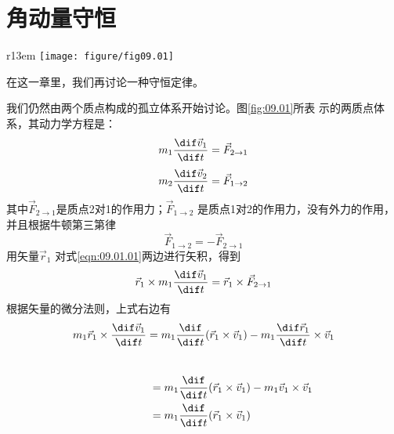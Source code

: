 \documentclass[../outline-of-mechanics.tex]{subfiles}
\begin{document}
\section{角动量守恒}

\begin{wrapfigure}[6]{r}{13em}
  \vspace{-4em}
  \centering
  \texttt{[image: figure/fig09.01]}
  \caption{两质点体系}
  \label{fig:09.01}
\end{wrapfigure}
在这一章里，我们再讨论一种守恒定律。

我们仍然由两个质点构成的孤立体系开始讨论。图\ref{fig:09.01}所表
示的两质点体系，其动力学方程是：
\begin{equation}\label{eqn:09.01.01}
  m _ { 1 } \frac { \dif \vec{v} _ { 1 } } { \dif t } = \vec{F} _ { 2 \to 1 }
\end{equation}
\begin{equation}\label{eqn:09.01.02}
  m _ { 2 } \frac { \dif \vec{v} _ { 2 } } { \dif t } = \vec{F} _ { 1 \to 2 }
\end{equation}
其中$\vec{F} _ { 2 \to 1 }$是质点2对1的作用力；$\vec{F} _ { 1 \to 2 }$
是质点1对2的作用力，没有外力的作用，并且根据牛顿第三第律
\begin{equation}\label{eqn:09.01.03}
  \vec{F} _ { 1 \to 2 } = - \vec{F} _ { 2 \to 1 }
\end{equation}
用矢量$\vec{r} _ { 1 }$ 对式\eqref{eqn:09.01.01}两边进行矢积，得到
\begin{equation*}
  \vec{r} _ { 1 } \times m _ { 1 } \frac { \dif \vec{v} _ { 1 } } { \dif t } = \vec{r} _ { 1 } \times \vec{F} _ { 2 \to 1 }
\end{equation*}
根据矢量的微分法则，上式右边有
\begin{equation*}
  m _ 1 \vec{r} _ { 1 } \times \frac { \dif \vec{v}_ { 1 } } { \dif t } = m _ { 1 } \frac { \dif } { \dif t } ( \vec{r} _ { 1 } \times \vec{v} _ { 1 }) - m _ { 1 } \frac { \dif \vec{r} _ { 1 } } { \dif t} \times \vec{v} _ { 1 }
\end{equation*}
\clearpage\mbox{}~\vspace{-2em}
\begin{equation*}
  \begin{aligned}
    \hspace{5em} & = m _ { 1 } \frac { \dif } { \dif t } ( \vec{r} _ { 1 } \times \vec{v} _ { 1 } ) - m _ { 1 } \vec{v} _ { 1 } \times \vec{v} _ { 1 } \\
                 & = m _ { 1 } \frac { \dif } { \dif t } ( \vec{r} _ { 1 } \times \vec{v} _ { 1 } )
  \end{aligned}
\end{equation*}
\end{document}
